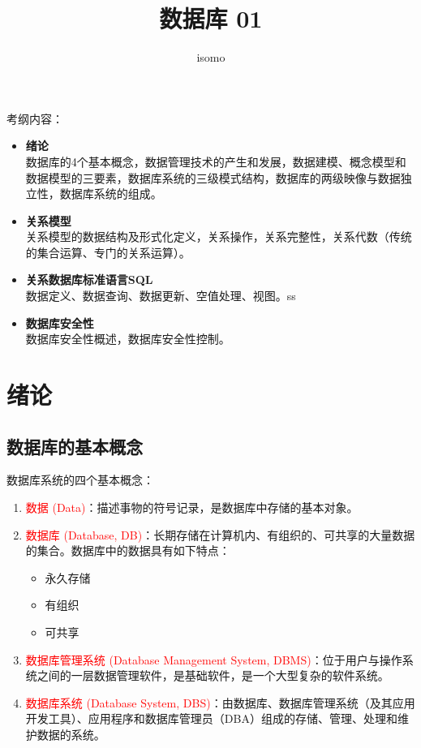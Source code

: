 \documentclass{../../note}
\title{数据库 01}
\author{isomo}
\begin{document}
\maketitle

考纲内容：

\begin{itemize}

  \item \textbf{绪论}\\
    数据库的4个基本概念，数据管理技术的产生和发展，数据建模、概念模型和数据模型的三要素，数据库系统的三级模式结构，数据库的两级映像与数据独立性，数据库系统的组成。

  \item \textbf{关系模型}\\
    关系模型的数据结构及形式化定义，关系操作，关系完整性，关系代数（传统的集合运算、专门的关系运算）。

  \item \textbf{关系数据库标准语言SQL}\\
    数据定义、数据查询、数据更新、空值处理、视图。ss

  \item \textbf{数据库安全性}\\
    数据库安全性概述，数据库安全性控制。

\end{itemize}

\section{绪论}

\subsection{数据库的基本概念}

数据库系统的四个基本概念：

\begin{enumerate}
  \item \textcolor{red}{数据 (Data)}：描述事物的符号记录，是数据库中存储的基本对象。

  \item \textcolor{red}{数据库 (Database, DB)}：长期存储在计算机内、有组织的、可共享的大量数据的集合。数据库中的数据具有如下特点：
    \begin{itemize}
      \item 永久存储
      \item 有组织
      \item 可共享
    \end{itemize}

  \item \textcolor{red}{数据库管理系统 (Database Management System, DBMS)}：位于用户与操作系统之间的一层数据管理软件，是基础软件，是一个大型复杂的软件系统。

  \item \textcolor{red}{数据库系统 (Database System, DBS)}：由数据库、数据库管理系统（及其应用开发工具）、应用程序和数据库管理员（DBA）组成的存储、管理、处理和维护数据的系统。
\end{enumerate}
\end{document}
